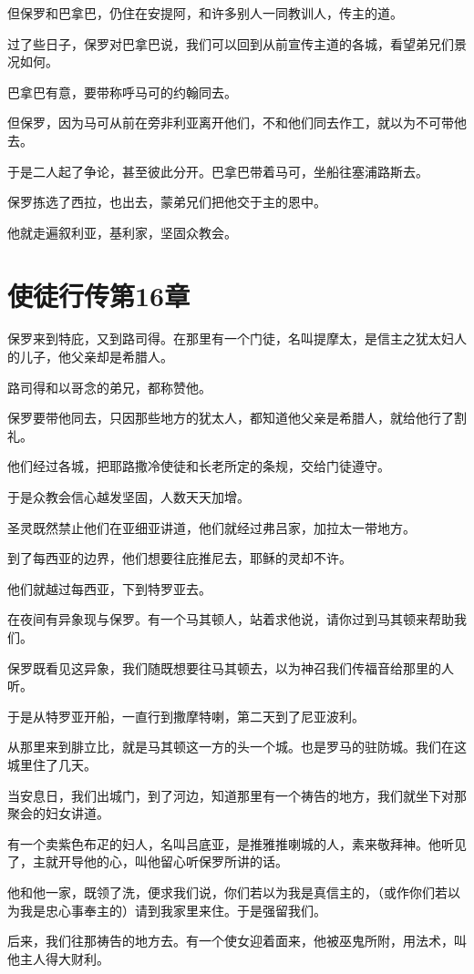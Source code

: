 \documentclass[12pt,oneside]{book}
\begin{document}
但保罗和巴拿巴，仍住在安提阿，和许多别人一同教训人，传主的道。

过了些日子，保罗对巴拿巴说，我们可以回到从前宣传主道的各城，看望弟兄们景况如何。

巴拿巴有意，要带称呼马可的约翰同去。

但保罗，因为马可从前在旁非利亚离开他们，不和他们同去作工，就以为不可带他去。

于是二人起了争论，甚至彼此分开。巴拿巴带着马可，坐船往塞浦路斯去。

保罗拣选了西拉，也出去，蒙弟兄们把他交于主的恩中。

他就走遍叙利亚，基利家，坚固众教会。

\chapter{使徒行传第16章}
保罗来到特庇，又到路司得。在那里有一个门徒，名叫提摩太，是信主之犹太妇人的儿子，他父亲却是希腊人。

路司得和以哥念的弟兄，都称赞他。

保罗要带他同去，只因那些地方的犹太人，都知道他父亲是希腊人，就给他行了割礼。

他们经过各城，把耶路撒冷使徒和长老所定的条规，交给门徒遵守。

于是众教会信心越发坚固，人数天天加增。

圣灵既然禁止他们在亚细亚讲道，他们就经过弗吕家，加拉太一带地方。

到了每西亚的边界，他们想要往庇推尼去，耶稣的灵却不许。

他们就越过每西亚，下到特罗亚去。

在夜间有异象现与保罗。有一个马其顿人，站着求他说，请你过到马其顿来帮助我们。

保罗既看见这异象，我们随既想要往马其顿去，以为神召我们传福音给那里的人听。

于是从特罗亚开船，一直行到撒摩特喇，第二天到了尼亚波利。

从那里来到腓立比，就是马其顿这一方的头一个城。也是罗马的驻防城。我们在这城里住了几天。

当安息日，我们出城门，到了河边，知道那里有一个祷告的地方，我们就坐下对那聚会的妇女讲道。

有一个卖紫色布疋的妇人，名叫吕底亚，是推雅推喇城的人，素来敬拜神。他听见了，主就开导他的心，叫他留心听保罗所讲的话。

他和他一家，既领了洗，便求我们说，你们若以为我是真信主的，（或作你们若以为我是忠心事奉主的）请到我家里来住。于是强留我们。

后来，我们往那祷告的地方去。有一个使女迎着面来，他被巫鬼所附，用法术，叫他主人得大财利。
\end{document}
